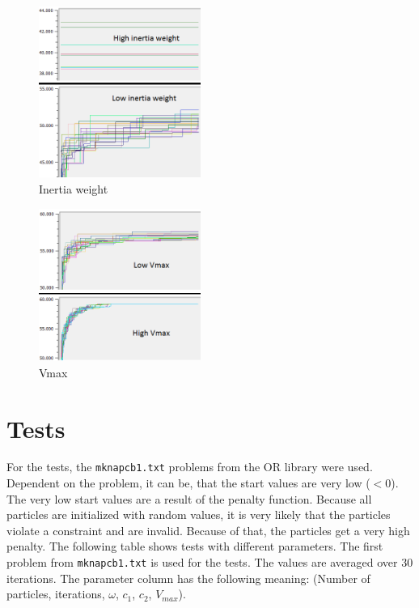 \documentclass{article}
\begin{document}
\begin{figure}[H]
    \centering
    \includegraphics[width=200px]{images/inertia.PNG}
    \caption{Inertia weight}
    \label{fig-inertia}
\end{figure}

\begin{figure}[H]
    \centering
    \includegraphics[width=200px]{images/vmax.PNG}
    \caption{Vmax}
    \label{fig-vmax}
\end{figure}

\section{Tests}
\label{lbl-tests}
For the tests, the \lstinline$mknapcb1.txt$ problems from the OR library were used.  Dependent on the problem, it can be, that the start values are very low ($< 0$). The very low start values are a result of the penalty function. Because all particles are initialized with random values, it is very likely that the particles violate a constraint and are invalid. Because of that, the particles get a very high penalty. The following table shows tests with different parameters. The first problem from \lstinline$mknapcb1.txt$ is used for the tests. The values are averaged over 30 iterations. The parameter column has the following meaning: (Number of particles, iterations, $\omega$, $c_1$, $c_2$, $V_{max}$). \\
\end{document}
